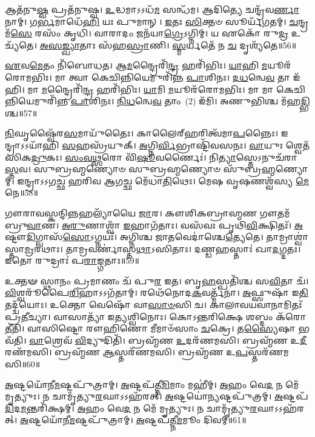 𑌆𑌤᳴𑌨𑍁\-\ul{𑌷𑍍𑌵} 𑌪𑍍𑌰𑌤᳴𑌨𑍁𑌷𑍍𑌵। \ul{𑌉}\-𑌦𑍍𑌧𑌮𑌾𑌽𑌽𑌧᳴\-\ul{𑌮} 𑌸𑌨𑍍𑌧᳴𑌮। 
𑌆𑌦𑌿𑌤𑍍𑌯𑍇 𑌚𑌨𑍍𑌦𑍍𑌰᳴𑌵\-\ul{𑌰𑍍𑌣𑌾}\-𑌨𑌾𑌮𑍍। 𑌗\-\ul{𑌰𑍍𑌭}\-𑌮𑌾𑌧𑍇᳴\-\ul{𑌹𑌿} 𑌯𑌃 𑌪𑍁𑌮𑌾𑌨𑍍। 
\-\ul{𑌇}\-𑌤𑌃 \ul{𑌸𑌿}\-𑌕𑍍𑌤𑍞 𑌸𑍂𑌰𑍍𑌯᳴𑌗𑌤𑌮𑍍। \ul{𑌚}\-𑌨𑍍𑌦𑍍𑌰𑌮᳴\-\ul{𑌸𑍇} 𑌰𑌸𑌂᳴ 𑌕𑍃𑌧𑌿। 
𑌵𑌾𑌰𑌾𑌦𑌂 𑌜𑌨᳴𑌯𑌾\-\ul{𑌗𑍍𑌰𑍇}\-𑌽𑌗𑍍𑌨𑌿𑌮𑍍। 𑌯 𑌏𑌕𑍋᳴ 𑌰𑍁\-\ul{𑌦𑍍𑌰} 𑌉𑌚𑍍𑌯᳴𑌤𑍇। 
\-\ul{𑌅}\-\-\ul{𑌸}\-\-\ul{𑌙𑍍𑌖𑍍𑌯𑌾}\-𑌤𑌾𑌃 𑌸᳴𑌹\-\ul{𑌸𑍍𑌰𑌾}\-𑌣𑌿। \ul{𑌸𑍍𑌮}\-𑌰𑍍𑌯𑌤𑍇᳴ 𑌨 \ul{𑌚} 𑌦𑍃𑌶𑍍𑌯᳴𑌤𑍇॥56॥


\-\ul{𑌏}\-𑌵\-\ul{𑌮𑍇}\-𑌤𑌂 𑌨𑌿᳴𑌬𑍋𑌧𑌤। 𑌆\-\ul{𑌮}\-𑌨𑍍𑌦𑍍𑌰𑍈𑌰𑌿᳴\-\ul{𑌨𑍍𑌦𑍍𑌰} 𑌹𑌰𑌿᳴𑌭𑌿𑌃। 
\-\ul{𑌯𑌾}\-𑌹𑌿 \ul{𑌮}\-𑌯𑍂𑌰᳴𑌰𑍋𑌮𑌭𑌿𑌃। 𑌮𑌾 𑌤𑍍𑌵𑌾 𑌕𑍇𑌚𑌿𑌨𑍍𑌨𑌿𑌯𑍇𑌮𑍁𑌰𑌿᳴𑌨𑍍𑌨 \ul{𑌪𑌾}\-𑌶𑌿𑌨𑌃। 
\-\ul{𑌦}\-\-\ul{𑌧}\-𑌨𑍍𑌵𑍇\-\ul{𑌵} 𑌤𑌾 𑌇᳴𑌹𑌿। 𑌮𑌾 \ul{𑌮}\-𑌨𑍍𑌦𑍍𑌰𑍈𑌰𑌿᳴\-\ul{𑌨𑍍𑌦𑍍𑌰} 𑌹𑌰𑌿᳴𑌭𑌿𑌃। 
\-\ul{𑌯𑌾}\-𑌮𑌿 \ul{𑌮}\-𑌯𑍂𑌰᳴𑌰𑍋𑌮𑌭𑌿𑌃। 𑌮𑌾 𑌮𑌾 𑌕𑍇𑌚𑌿𑌨𑍍𑌨𑌿𑌯𑍇𑌮𑍁𑌰𑌿᳴𑌨𑍍𑌨 \ul{𑌪𑌾}\-𑌶𑌿𑌨𑌃। 
\-\ul{𑌨𑌿}\-\-\ul{𑌧}\-𑌨𑍍𑌵𑍇\-\ul{𑌵} \mbox{𑌤𑌾𑌂 (2)} 𑌇᳴𑌮𑌿। 𑌅𑌣𑍁𑌭𑌿𑌶𑍍𑌚 𑌮᳴𑌹\-\ul{𑌦𑍍𑌭𑌿}\-𑌶𑍍𑌚॥57॥


\-\ul{𑌨𑌿}\-𑌘𑍃𑌷𑍍𑌵𑍈᳴𑌰\-\ul{𑌸}\-𑌮𑌾𑌯𑍁᳴𑌤𑍈𑌃। 𑌕𑌾𑌲𑍈𑌰𑍍‌𑌹𑌰𑌿𑌤𑍍𑌵᳴𑌮𑌾\-\ul{𑌪}\-𑌨𑍍𑌨𑍈𑌃। 
𑌇𑌨𑍍𑌦𑍍𑌰𑌾𑌽𑌽𑌯𑌾᳴𑌹𑌿 \ul{𑌸}\-𑌹𑌸𑍍𑌰᳴𑌯𑍁𑌕𑍍। \ul{𑌅}\-𑌗𑍍𑌨𑌿\-\ul{𑌰𑍍𑌵𑌿}\-𑌭𑍍𑌰𑌾𑌷𑍍𑌟𑌿᳴𑌵𑌸𑌨𑌃। 
\-\ul{𑌵𑌾}\-𑌯𑍁𑌃 𑌶𑍍𑌵𑍇𑌤᳴𑌸𑌿𑌕\-\ul{𑌦𑍍𑌰𑍁}\-𑌕𑌃। \ul{𑌸𑌂}\-\-\ul{𑌵}\-\-\ul{𑌥𑍍𑌸}\-𑌰𑍋 𑌵𑌿᳴\-\ul{𑌷𑍂}\-𑌵𑌰𑍍𑌣𑍈𑌃॑। 
𑌨𑌿\-\ul{𑌤𑍍𑌯𑌾}\-𑌸𑍍𑌤𑍇𑌽𑌨𑍁𑌚᳴𑌰𑌾\-\ul{𑌸𑍍𑌤}\-𑌵। 𑌸𑍁𑌬𑍍𑌰𑌹𑍍𑌮𑌣𑍍𑌯𑍋𑍞 𑌸𑍁𑌬𑍍𑌰𑌹𑍍𑌮𑌣𑍍𑌯𑍋𑍞 𑌸𑍁᳴𑌬𑍍𑌰\-\ul{𑌹𑍍𑌮}\-𑌣𑍍𑌯𑍋𑌮𑍍। 
𑌇𑌨𑍍𑌦𑍍𑌰𑌾𑌽𑌽𑌗𑌚𑍍𑌛 𑌹𑌰𑌿𑌵 𑌆𑌗𑌚𑍍𑌛 𑌮𑍇᳴𑌧𑌾\-\ul{𑌤𑌿}\-𑌥𑍇𑌃। 𑌮𑍇𑌷 𑌵𑍃𑌷𑌣𑌶𑍍𑌵᳴𑌸𑍍𑌯 \ul{𑌮𑍇}\-𑌨𑍇॥58॥


𑌗𑍗𑌰𑌾𑌵𑌸𑍍𑌕𑌨𑍍𑌦𑌿𑌨𑍍𑌨𑌹𑌲𑍍𑌯𑌾᳴𑌯𑍈 \ul{𑌜𑌾}\-𑌰। 𑌕𑍗𑌶𑌿𑌕𑌬𑍍𑌰𑌾𑌹𑍍𑌮𑌣 𑌗𑍗𑌤𑌮᳴𑌬𑍍𑌰𑍁\-\ul{𑌵𑌾}\-𑌣। 
\-\ul{𑌅}\-\-\ul{𑌰𑍁}\-𑌣𑌾𑌶𑍍𑌵𑌾᳴ \ul{𑌇}\-𑌹𑌾𑌗᳴𑌤𑌾𑌃। 𑌵𑌸᳴𑌵𑌃 𑌪𑍃𑌥𑌿\-\ul{𑌵𑌿}\-𑌕𑍍𑌷𑌿𑌤𑌃᳴। 
\-\ul{𑌅}\-𑌷𑍍𑌟𑍗\-\ul{𑌦𑌿}\-𑌗𑍍𑌵𑌾𑌸᳴\-\ul{𑌸𑍋}\-\-𑌽𑌗𑍍𑌨𑌯𑌃᳴। 𑌅𑌗𑍍𑌨𑌿𑌶𑍍𑌚 𑌜𑌾𑌤𑌵𑍇𑌦𑌾॑𑌶𑍍𑌚𑍇\-\ul{𑌤𑍍𑌯𑍇}\-𑌤𑍇। 
𑌤𑌾𑌮𑍍𑌰𑌾𑌶𑍍𑌵𑌾॑𑌸𑍍𑌤𑌾\-\ul{𑌮𑍍𑌰}\-𑌰𑌥𑌾𑌃। 𑌤𑌾𑌮𑍍𑌰𑌵𑌰𑍍𑌣𑌾॑𑌸𑍍𑌤\-\ul{𑌥𑌾}\-\-𑌽𑌸𑌿𑌤𑌾𑌃। 
𑌦𑌣𑍍𑌡𑌹𑌸𑍍𑌤𑌾𑌃॑ 𑌖𑌾\-\ul{𑌦}\-𑌗𑍍𑌦𑌤𑌃। 𑌇𑌤𑍋 𑌰𑍁𑌦𑍍𑌰𑌾𑌃॑ 𑌪\-\ul{𑌰𑌾}\-𑌙𑍍𑌗𑌤𑌾𑌃॥59॥


𑌉𑌕𑍍𑌤𑍟 𑌸𑍍𑌥𑌾𑌨𑌂 𑌪𑍍𑌰𑌮𑌾𑌣𑌂 𑌚᳴ 𑌪𑍁\-\ul{𑌰} 𑌇𑌤। 𑌬𑍃\-\ul{𑌹}\-𑌸𑍍𑌪𑌤𑌿᳴𑌶𑍍𑌚 𑌸\-\ul{𑌵𑌿}\-𑌤𑌾 𑌚᳴। 
\-\ul{𑌵𑌿}\-𑌶𑍍𑌵𑌰𑍂᳴𑌪𑍈\-\ul{𑌰𑌿}\-𑌹𑌾𑌽𑌽𑌗᳴𑌤𑌾𑌮𑍍। 𑌰𑌥𑍇᳴𑌨𑍋𑌦\-\ul{𑌕}\-𑌵𑌰𑍍𑌤𑍍𑌮᳴𑌨𑌾। 
\-\ul{𑌅}\-𑌫𑍍𑌸𑍁𑌷𑌾᳴ 𑌇\-\ul{𑌤𑌿} 𑌤𑌦𑍍𑌦𑍍𑌵᳴𑌯𑍋𑌃। 𑌉𑌕𑍍𑌤𑍋 𑌵𑍇𑌷𑍋᳴ 𑌵𑌾\-\ul{𑌸𑌾}\-\-\ul{𑍞}\-𑌸𑌿 𑌚। 
𑌕𑌾𑌲𑌾𑌵𑌯𑌵𑌾𑌨𑌾𑌮𑌿𑌤𑌃᳴ 𑌪𑍍𑌰\-\ul{𑌤𑍀}\-𑌚𑍍𑌯𑌾। 𑌵𑌾𑌸𑌾𑌤𑍍𑌯𑌾᳴ 𑌇\-\ul{𑌤𑍍𑌯}\-𑌶𑍍𑌵𑌿𑌨𑍋𑌃। 
𑌕𑍋𑌽𑌨𑍍𑌤𑌰𑌿𑌕𑍍𑌷𑍇 𑌶𑌬𑍍𑌦𑌂 𑌕᳴𑌰𑍋\-\ul{𑌤𑍀}\-𑌤𑌿। 𑌵𑌾𑌸𑌿𑌷𑍍𑌟𑍋 𑌰𑍗𑌹𑌿𑌣𑍋 𑌮𑍀𑌮𑌾𑍞᳴𑌸𑌾𑌂 \ul{𑌚}\-𑌕𑍍𑌰𑍇। 
𑌤\-\ul{𑌸𑍍𑌯𑍈}\-𑌷𑌾 𑌭𑌵᳴𑌤𑌿। \ul{𑌵𑌾}\-𑌶𑍍𑌰𑍇𑌵᳴ \ul{𑌵𑌿}\-𑌦𑍍𑌯𑍁𑌦𑌿𑌤𑌿᳴। 
𑌬𑍍𑌰𑌹𑍍𑌮᳴𑌣 \ul{𑌉}\-𑌦𑌰᳴𑌣𑌮𑌸𑌿। 𑌬𑍍𑌰𑌹𑍍𑌮᳴𑌣 𑌉\-\ul{𑌦𑍀}\-𑌰𑌣᳴𑌮𑌸𑌿। 
𑌬𑍍𑌰𑌹𑍍𑌮᳴𑌣 \ul{𑌆}\-𑌸𑍍𑌤𑌰᳴𑌣𑌮𑌸𑌿। 𑌬𑍍𑌰𑌹𑍍𑌮᳴𑌣 𑌉\-\ul{𑌪}\-𑌸𑍍𑌤𑌰᳴𑌣𑌮𑌸𑌿॥60॥\anuvakamend


\noindent [𑌅𑌪᳴𑌕𑍍𑌰𑌾𑌮𑌤 𑌗\-\ul{𑌰𑍍𑌭𑌿}\-𑌣𑍍𑌯𑌃᳴]

\-\ul{𑌅}\-𑌷𑍍𑌟𑌯𑍋᳴𑌨𑍀\-\ul{𑌮}\-𑌷𑍍𑌟𑌪𑍁᳴𑌤𑍍𑌰𑌾𑌮𑍍। \ul{𑌅}\-𑌷𑍍𑌟𑌪᳴𑌤𑍍𑌨𑍀\-\ul{𑌮𑌿}\-𑌮𑌾𑌂 𑌮𑌹𑍀॑𑌮𑍍। 
\-\ul{𑌅}\-𑌹𑌂 𑌵𑍇\-\ul{𑌦} 𑌨 𑌮𑍇᳴ 𑌮𑍃𑌤𑍍𑌯𑍁𑌃। 𑌨 𑌚𑌾𑌮𑍃᳴𑌤𑍍𑌯𑍁\-\ul{𑌰}\-𑌘𑌾𑌽𑌽𑌹᳴𑌰𑌤𑍍। 
\-\ul{𑌅}\-𑌷𑍍𑌟𑌯𑍋॑\-\ul{𑌨𑍍𑌯}\-𑌷𑍍𑌟𑌪𑍁᳴𑌤𑍍𑌰𑌮𑍍। \ul{𑌅}\-𑌷𑍍𑌟𑌪᳴\-\ul{𑌦𑌿}\-𑌦\-\ul{𑌮}\-𑌨𑍍𑌤𑌰𑌿᳴𑌕𑍍𑌷𑌮𑍍। 
\-\ul{𑌅}\-𑌹𑌂 𑌵𑍇\-\ul{𑌦} 𑌨 𑌮𑍇᳴ 𑌮𑍃𑌤𑍍𑌯𑍁𑌃। 𑌨 𑌚𑌾𑌮𑍃᳴𑌤𑍍𑌯𑍁\-\ul{𑌰}\-𑌘𑌾𑌽𑌽𑌹᳴𑌰𑌤𑍍। 
\-\ul{𑌅}\-𑌷𑍍𑌟𑌯𑍋᳴𑌨𑍀\-\ul{𑌮}\-𑌷𑍍𑌟𑌪𑍁᳴𑌤𑍍𑌰𑌾𑌮𑍍। \ul{𑌅}\-𑌷𑍍𑌟𑌪᳴𑌤𑍍𑌨𑍀\-\ul{𑌮}\-𑌮𑍂𑌂 𑌦𑌿𑌵𑌮𑍍‌॑॥61॥


